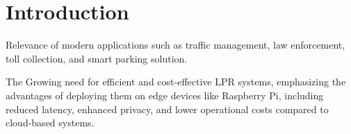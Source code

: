 \chapter{Introduction}
\label{chapter:intro}




Relevance of modern applications such as traffic management, law enforcement, toll collection, and smart parking solution.

The Growing need for efficient and cost-effective LPR systems, emphasizing the advantages of deploying them on edge
devices like Raspberry Pi, including reduced latency, enhanced privacy, and lower operational costs compared to cloud-based systems.